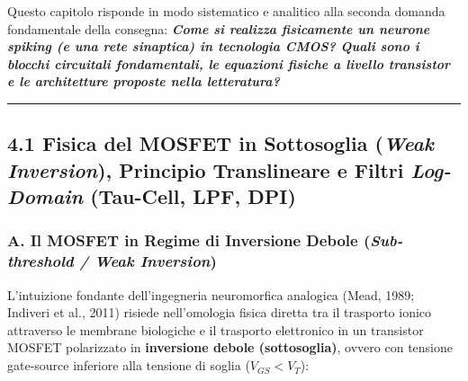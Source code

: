 \documentclass[11pt,a4paper]{article}
\begin{document}
Questo capitolo risponde in modo sistematico e analitico alla seconda domanda fondamentale della consegna: \textbf{\textit{Come si realizza fisicamente un neurone spiking (e una rete sinaptica) in tecnologia CMOS? Quali sono i blocchi circuitali fondamentali, le equazioni fisiche a livello transistor e le architetture proposte nella letteratura?}}

\bigskip\hrule\bigskip

\subsection{4.1 Fisica del MOSFET in Sottosoglia (\textit{Weak Inversion}), Principio Translineare e Filtri \textit{Log-Domain} (Tau-Cell, LPF, DPI)}

\subsubsection{A. Il MOSFET in Regime di Inversione Debole (\textit{Sub-threshold / Weak Inversion})}
L'intuizione fondante dell'ingegneria neuromorfica analogica (Mead, 1989; Indiveri et al., 2011) risiede nell'omologia fisica diretta tra il trasporto ionico attraverso le membrane biologiche e il trasporto elettronico in un transistor MOSFET polarizzato in \textbf{inversione debole (sottosoglia)}, ovvero con tensione gate-source inferiore alla tensione di soglia ($V_{GS} < V_T$):
\end{document}
